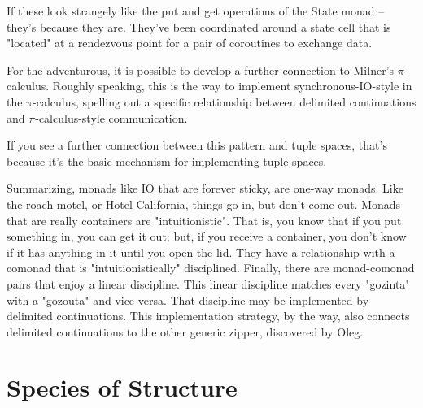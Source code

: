 If these look strangely like the put and get operations of the State
monad -- they's because they are. They've been coordinated around a
state cell that is "located" at a rendezvous point for a pair of
coroutines to exchange data.

For the adventurous, it is possible to develop a further connection to
Milner's $\pi$-calculus. Roughly speaking, this is the way to
implement synchronous-IO-style in the $\pi$-calculus, spelling out a
specific relationship between delimited continuations and
$\pi$-calculus-style communication.

If you see a further connection between this pattern and tuple spaces,
that's because it's the basic mechanism for implementing tuple spaces.

Summarizing, monads like IO that are forever sticky, are one-way
monads. Like the roach motel, or Hotel California, things go in, but
don't come out. Monads that are really containers are
"intuitionistic". That is, you know that if you put something in, you
can get it out; but, if you receive a container, you don't know if it
has anything in it until you open the lid. They have a relationship
with a comonad that is "intuitionistically" disciplined. Finally,
there are monad-comonad pairs that enjoy a linear discipline. This
linear discipline matches every "gozinta" with a "gozouta" and vice
versa. That discipline may be implemented by delimited
continuations. This implementation strategy, by the way, also connects
delimited continuations to the other generic zipper, discovered by
Oleg.

\section{Species of Structure}